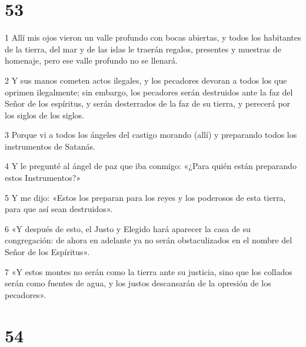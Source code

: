 \chapter{53}

\par 1 Allí mis ojos vieron un valle profundo con bocas abiertas, y todos los habitantes de la tierra, del mar y de las islas le traerán regalos, presentes y muestras de homenaje, pero ese valle profundo no se llenará.
\par 2 Y sus manos cometen actos ilegales, y los pecadores devoran a todos los que oprimen ilegalmente; sin embargo, los pecadores serán destruidos ante la faz del Señor de los espíritus, y serán desterrados de la faz de su tierra, y perecerá por los siglos de los siglos.
\par 3 Porque vi a todos los ángeles del castigo morando (allí) y preparando todos los instrumentos de Satanás.
\par 4 Y le pregunté al ángel de paz que iba conmigo: «¿Para quién están preparando estos Instrumentos?»
\par 5 Y me dijo: «Estos los preparan para los reyes y los poderosos de esta tierra, para que así sean destruidos».
\par 6 «Y después de esto, el Justo y Elegido hará aparecer la casa de su congregación: de ahora en adelante ya no serán obstaculizados en el nombre del Señor de los Espíritus».
\par 7 «Y estos montes no serán como la tierra ante su justicia, sino que los collados serán como fuentes de agua, y los justos descansarán de la opresión de los pecadores».

\chapter{54}

